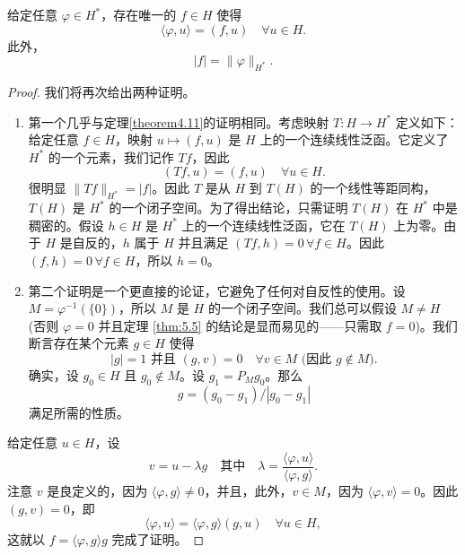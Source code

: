 \begin{theorem}\label{thm:5.5}
给定任意 $\varphi \in H^*$，存在唯一的 $f \in H$ 使得
\[ \langle \varphi, u \rangle = (f, u) \quad \forall u \in H. \]
此外，
\[ |f| = \|\varphi\|_{H^*}. \]
\end{theorem}
\begin{proof}
我们将再次给出两种证明。
\begin{enumerate}
    \item 第一个几乎与定理\ref{theorem4.11}的证明相同。考虑映射 $T: H \to H^*$ 定义如下：给定任意 $f \in H$，映射 $u \mapsto (f,u)$ 是 $H$ 上的一个连续线性泛函。它定义了 $H^*$ 的一个元素，我们记作 $Tf$，因此
    \[ (Tf, u) = (f, u) \quad \forall u \in H. \]
    很明显 $\|Tf\|_{H^*} = |f|$。因此 $T$ 是从 $H$ 到 $T(H)$ 的一个线性等距同构，$T(H)$ 是 $H^*$ 的一个闭子空间。为了得出结论，只需证明 $T(H)$ 在 $H^*$ 中是稠密的。假设 $h \in H$ 是 $H^*$ 上的一个连续线性泛函，它在 $T(H)$ 上为零。由于 $H$ 是自反的，$h$ 属于 $H$ 并且满足 $(Tf, h) = 0 \, \forall f \in H$。因此 $(f, h) = 0 \, \forall f \in H$，所以 $h=0$。
    \item 第二个证明是一个更直接的论证，它避免了任何对自反性的使用。设 $M = \varphi^{-1}(\{0\})$，所以 $M$ 是 $H$ 的一个闭子空间。我们总可以假设 $M \ne H$ (否则 $\varphi=0$ 并且定理 \ref{thm:5.5} 的结论是显而易见的——只需取 $f=0$)。我们断言存在某个元素 $g \in H$ 使得
    \[ |g|=1 \text{ 并且 } (g,v)=0 \quad \forall v \in M \text{ (因此 } g \notin M). \]
    确实，设 $g_0 \in H$ 且 $g_0 \notin M$。设 $g_1 = P_M g_0$。那么
    \[ g = (g_0 - g_1) / |g_0 - g_1| \]
    满足所需的性质。
\end{enumerate}
给定任意 $u \in H$，设
\[ v = u - \lambda g \quad \text{其中} \quad \lambda = \frac{\langle \varphi, u \rangle}{\langle \varphi, g \rangle}. \]
注意 $v$ 是良定义的，因为 $\langle \varphi, g \rangle \ne 0$，并且，此外，$v \in M$，因为 $\langle \varphi, v \rangle = 0$。因此 $(g,v)=0$，即
\[ \langle \varphi, u \rangle = \langle \varphi, g \rangle (g,u) \quad \forall u \in H, \]
这就以 $f = \langle \varphi, g \rangle g$ 完成了证明。
\end{proof}


